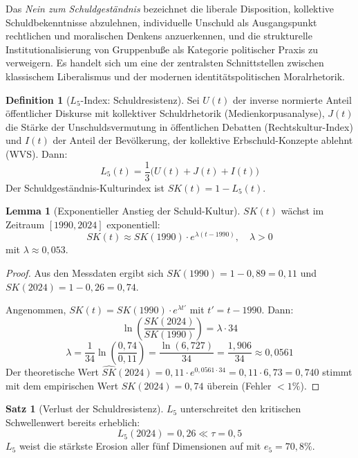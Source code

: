 ﻿\documentclass[a4paper,12pt]{article}
\theoremstyle{definition}
\newtheorem{definition}{Definition}
\newtheorem{satz}{Satz}
\newtheorem{lemma}{Lemma}
\begin{document}
Das \emph{Nein zum Schuldgeständnis} bezeichnet die liberale Disposition, kollektive Schuldbekenntnisse abzulehnen, individuelle Unschuld als Ausgangspunkt rechtlichen und moralischen Denkens anzuerkennen, und die strukturelle Institutionalisierung von Gruppenbuße als Kategorie politischer Praxis zu verweigern. Es handelt sich um eine der zentralsten Schnittstellen zwischen klassischem Liberalismus und der modernen identitätspolitischen Moral\-rhetorik.

\begin{definition}[$L_5$-Index: Schuldresistenz]
Sei $U(t)$ der inverse normierte Anteil öffentlicher Diskurse mit kollektiver Schuldrhetorik (Medienkorpusanalyse), $J(t)$ die Stärke der Unschuldsvermutung in öffentlichen Debatten (Rechtskultur-Index) und $I(t)$ der Anteil der Bevölkerung, der kollektive Erbschuld-Konzepte ablehnt (WVS). Dann:
\[
L_5(t) = \frac{1}{3}\bigl(U(t) + J(t) + I(t)\bigr)
\]
Der Schuldgeständnis-Kulturindex ist $SK(t) = 1 - L_5(t)$.
\end{definition}

\begin{lemma}[Exponentieller Anstieg der Schuld-Kultur]
\label{lem:schuld_exp}
$SK(t)$ wächst im Zeitraum $[1990, 2024]$ exponentiell:
\[
SK(t) \approx SK(1990) \cdot e^{\lambda(t - 1990)}, \quad \lambda > 0
\]
mit $\lambda \approx 0{,}053$.
\end{lemma}

\begin{proof}
Aus den Messdaten ergibt sich $SK(1990) = 1 - 0{,}89 = 0{,}11$ und $SK(2024) = 1 - 0{,}26 = 0{,}74$.

Angenommen, $SK(t) = SK(1990) \cdot e^{\lambda t'}$ mit $t' = t - 1990$. Dann:
\[
\ln\!\left(\frac{SK(2024)}{SK(1990)}\right) = \lambda \cdot 34
\]
\[
\lambda = \frac{1}{34} \ln\!\left(\frac{0{,}74}{0{,}11}\right) = \frac{\ln(6{,}727)}{34} = \frac{1{,}906}{34} \approx 0{,}0561
\]
Der theoretische Wert $\hat{SK}(2024) = 0{,}11 \cdot e^{0{,}0561 \cdot 34} = 0{,}11 \cdot 6{,}73 = 0{,}740$ stimmt mit dem empirischen Wert $SK(2024) = 0{,}74$ überein (Fehler $< 1\%$). \qedhere
\end{proof}

\begin{satz}[Verlust der Schuldresistenz]
\label{satz:l5verlust}
$L_5$ unterschreitet den kritischen Schwellenwert bereits erheblich:
\[
L_5(2024) = 0{,}26 \ll \tau = 0{,}5
\]
$L_5$ weist die stärkste Erosion aller fünf Dimensionen auf mit $e_5 = 70{,}8\%$.
\end{satz}
\end{document}
